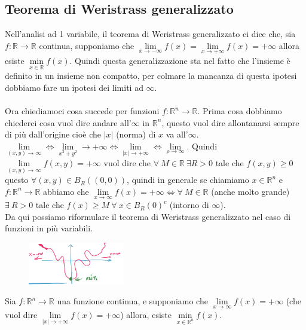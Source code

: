 \subsection{Teorema di Weristrass generalizzato}
Nell'analisi ad 1 variabile, il teorema di Weristrass generalizzato ci dice che, sia $f: \mathbb{R}\to \mathbb{R}$ continua, supponiamo che $\lim\limits_{x\to -\infty}f(x) = \lim\limits_{x\to +\infty}f(x) = +\infty$ allora esiste $\min\limits_{x \in \mathbb{R}}f(x)$. Quindi questa generalizzazione sta nel fatto che l'insieme è definito in un insieme non compatto, per colmare la mancanza di questa ipotesi dobbiamo fare un ipotesi dei limiti ad $\infty$.\\\\
Ora chiediamoci cosa succede per funzioni $f: \mathbb{R}^n \to \mathbb{R}$. Prima cosa dobbiamo chiederci cosa vuol dire andare all'$\infty$ in $\mathbb{R}^n$, questo vuol dire allontanarsi sempre di più dall'origine cioè che $|x|$ (norma) di $x$ va all'$\infty$. $\lim\limits_{(x,y) \to \infty} \Longleftrightarrow \lim\limits_{x^2 + y^2}\to +\infty \Longleftrightarrow \lim\limits_{|x| \to +\infty} \Longleftrightarrow \lim\limits_{\rho \to \infty}$. Quindi $\lim\limits_{(x,y)\to\infty}f(x,y) = +\infty$ vuol dire che $\forall \: M \in \mathbb{R} \: \exists R > 0$ tale che $f(x,y) \geq 0$ questo $\forall (x,y) \in B_R((0,0))$, quindi in generale se chiamiamo $x \in \mathbb{R}^n$ e $f: \mathbb{R}^n \to \mathbb{R}$ abbiamo che $\lim\limits_{x \to \infty}f(x) = +\infty \Longleftrightarrow \forall \: M \in \mathbb{R}$ (anche molto grande) $\exists \: R > 0$ tale che $f(x) \geq M \: \forall \: x \in B_R(0)^c$ (intorno di $\infty$).\\
Da qui possiamo riformulare il teorema di Weristrass generalizzato nel caso di funzioni in più variabili.
\begin{figure}
    \centering
    \includegraphics[width=4.2cm]{images/weristrass-generalizzato-R2.png}
\end{figure}

\begin{definition}
Sia $f: \mathbb{R}^n \to \mathbb{R}$ una funzione continua, e supponiamo che $\lim\limits_{x \to \infty}f(x) = +\infty$ (che vuol dire $\lim\limits_{|x| \to +\infty}f(x) = +\infty$) allora, esiste $\min\limits_{x\in \mathbb{R}^n}f(x)$.
\end{definition}

